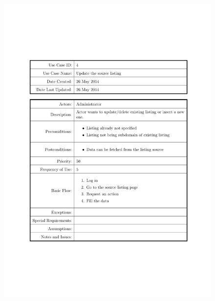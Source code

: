 \documentclass{tufte-book}
\begin{document}
\begin{figure}[h] \includegraphics[width=\linewidth]{Requirements/UseCases/004_SourceListingUpdate.pdf}\end{figure}
\end{document}
